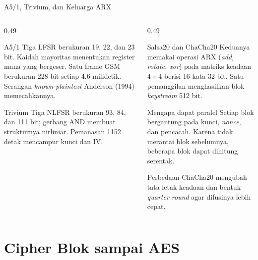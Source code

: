 \documentclass[aspectratio=169,11pt]{beamer}
\begin{document}
\begin{frame}{A5/1, Trivium, dan Keluarga ARX}
    \scriptsize
    \begin{columns}[T,onlytextwidth]
        \begin{column}{0.49\textwidth}
            \begin{block}{A5/1}
                Tiga LFSR berukuran 19, 22, dan 23 bit. Kaidah mayoritas
                menentukan register mana yang bergeser. Satu frame GSM
                berukuran 228 bit setiap 4,6 milidetik. Serangan
                \textit{known-plaintext} Anderson (1994) memecahkannya.
            \end{block}
            \begin{block}{Trivium}
                Tiga NLFSR berukuran 93, 84, dan 111 bit; gerbang AND membuat
                strukturnya nirliniar. Pemanasan 1152 detak mencampur kunci
                dan IV.
            \end{block}
        \end{column}
        \begin{column}{0.49\textwidth}
            \begin{block}{Salsa20 dan ChaCha20}
                Keduanya memakai operasi ARX (\textit{add, rotate, xor}) pada
                matriks keadaan $4 \times 4$ berisi 16 kata 32 bit. Satu
                pemanggilan menghasilkan blok \textit{keystream} 512 bit.
            \end{block}
            \begin{exampleblock}{Mengapa dapat paralel}
                Setiap blok bergantung pada kunci, \textit{nonce}, dan pencacah.
                Karena tidak merantai blok sebelumnya, beberapa blok dapat
                dihitung serentak.
            \end{exampleblock}
            \begin{alertblock}{Perbedaan}
                ChaCha20 mengubah tata letak keadaan dan bentuk
                \textit{quarter round} agar difusinya lebih cepat.
            \end{alertblock}
        \end{column}
    \end{columns}
\end{frame}

\section{Cipher Blok sampai AES}
\end{document}
